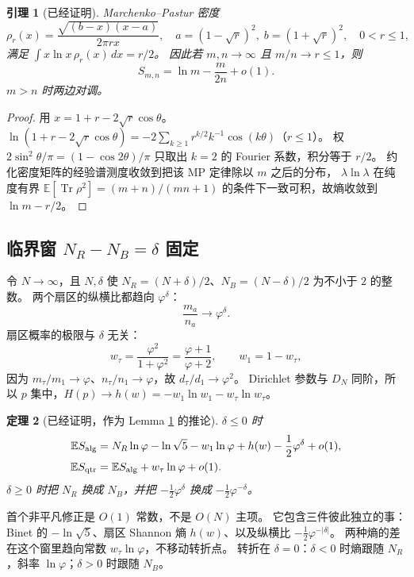 \documentclass[11pt]{ctexart}
\newtheorem{theorem}{定理}
\newtheorem{lemma}[theorem]{引理}
\theoremstyle{definition}
\theoremstyle{remark}
\newcommand{\E}{\mathbb E}
\newcommand{\Tr}{\operatorname{Tr}}
\newcommand{\ph}{\varphi}
\begin{document}
\begin{lemma}[已经证明]
\label{lem:mp}
Marchenko--Pastur 密度
\[
\rho_r(x)=\frac{\sqrt{(b-x)(x-a)}}{2\pi r x},\quad
a=(1-\sqrt r)^2,\; b=(1+\sqrt r)^2,\quad 0<r\le 1,
\]
满足 $\int x\ln x\,\rho_r(x)\,dx=r/2$。
因此若 $m,n\to\infty$ 且 $m/n\to r\le 1$，则
\[
S_{m,n}=\ln m-\frac{m}{2n}+o(1).
\]
$m>n$ 时两边对调。
\end{lemma}

\begin{proof}
用 $x=1+r-2\sqrt r\cos\theta$。
$\ln(1+r-2\sqrt r\cos\theta)=-2\sum_{k\ge 1} r^{k/2}k^{-1}\cos(k\theta)$（$r\le 1$）。
权 $2\sin^2\theta/\pi=(1-\cos 2\theta)/\pi$ 只取出 $k=2$ 的 Fourier 系数，积分等于 $r/2$。
约化密度矩阵的经验谱测度收敛到把该 MP 定律除以 $m$ 之后的分布，
$\lambda\ln\lambda$ 在纯度有界 $\E[\Tr\rho^2]=(m+n)/(mn+1)$ 的条件下一致可积，故熵收敛到 $\ln m-r/2$。
\end{proof}

\subsection{临界窗 $N_R-N_B=\delta$ 固定}
令 $N\to\infty$，且 $N,\delta$ 使 $N_R=(N+\delta)/2$、$N_B=(N-\delta)/2$ 为不小于 $2$ 的整数。
两个扇区的纵横比都趋向 $\ph^\delta$：
\[
\frac{m_a}{n_a}\to\ph^\delta.
\]
扇区概率的极限与 $\delta$ 无关：
\[
w_\tau=\frac{\ph^2}{1+\ph^2}=\frac{\ph+1}{\ph+2},\qquad
w_1=1-w_\tau,
\]
因为 $m_\tau/m_1\to\ph$、$n_\tau/n_1\to\ph$，故 $d_\tau/d_1\to\ph^2$。
Dirichlet 参数与 $D_N$ 同阶，所以 $p$ 集中，$H(p)\to h(w)=-w_1\ln w_1-w_\tau\ln w_\tau$。

\begin{theorem}[已经证明，作为 Lemma \ref{lem:mp} 的推论]
\label{thm:asymp}
$\delta\le 0$ 时
\begin{align*}
\E S_{\rm alg}
&=N_R\ln\ph-\ln\sqrt5-w_1\ln\ph+h(w)-\frac12\ph^{\delta}+o(1),\\
\E S_{\rm qtr}
&=\E S_{\rm alg}+w_\tau\ln\ph+o(1).
\end{align*}
$\delta\ge 0$ 时把 $N_R$ 换成 $N_B$，并把 $-\frac12\ph^{\delta}$ 换成 $-\frac12\ph^{-\delta}$。
\end{theorem}

首个非平凡修正是 $O(1)$ 常数，不是 $O(N)$ 主项。
它包含三件彼此独立的事：Binet 的 $-\ln\sqrt5$、扇区 Shannon 熵 $h(w)$、以及纵横比 $-\frac12\ph^{-|\delta|}$。
两种熵的差在这个窗里趋向常数 $w_\tau\ln\ph$，不移动转折点。
转折在 $\delta=0$：$\delta<0$ 时熵跟随 $N_R$，斜率 $\ln\ph$；$\delta>0$ 时跟随 $N_B$。
\end{document}
